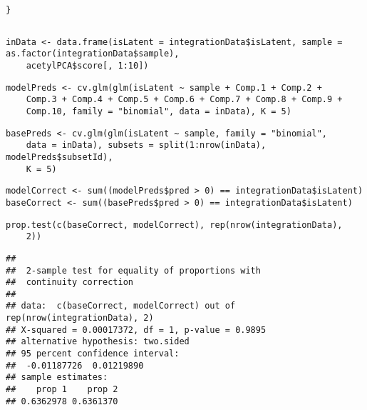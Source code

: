 \documentclass[../../sherrill-Mix_thesis.tex]{subfiles}
\makeatletter
\newenvironment{kframe}{%
 \def\at@end@of@kframe{}%
 \ifinner\ifhmode%
  \def\at@end@of@kframe{\end{minipage}}%
  \begin{minipage}{\columnwidth}%
 \fi\fi%
 \def\FrameCommand##1{\hskip\@totalleftmargin \hskip-\fboxsep
 \colorbox{shadecolor}{##1}\hskip-\fboxsep
     \hskip-\linewidth \hskip-\@totalleftmargin \hskip\columnwidth}%
 \MakeFramed {\advance\hsize-\width
   \@totalleftmargin\z@ \linewidth\hsize
   \@setminipage}}%
 {\par\unskip\endMakeFramed%
 \at@end@of@kframe}
\newenvironment{knitrout}{}{} %
\makeatother
\begin{document}
\begin{knitrout}
\begin{kframe}
\begin{lstlisting}[basicstyle=\ttfamily,breaklines=true]
}\end{lstlisting}
\begin{lstlisting}[basicstyle=\ttfamily,breaklines=true]
\end{lstlisting}
\begin{lstlisting}[basicstyle=\ttfamily,breaklines=true]
inData <- data.frame(isLatent = integrationData$isLatent, sample = as.factor(integrationData$sample), 
    acetylPCA$score[, 1:10])\end{lstlisting}
\begin{lstlisting}[basicstyle=\ttfamily,breaklines=true]
modelPreds <- cv.glm(glm(isLatent ~ sample + Comp.1 + Comp.2 + 
    Comp.3 + Comp.4 + Comp.5 + Comp.6 + Comp.7 + Comp.8 + Comp.9 + 
    Comp.10, family = "binomial", data = inData), K = 5)\end{lstlisting}
\begin{lstlisting}[basicstyle=\ttfamily,breaklines=true]
basePreds <- cv.glm(glm(isLatent ~ sample, family = "binomial", 
    data = inData), subsets = split(1:nrow(inData), modelPreds$subsetId), 
    K = 5)\end{lstlisting}
\begin{lstlisting}[basicstyle=\ttfamily,breaklines=true]
modelCorrect <- sum((modelPreds$pred > 0) == integrationData$isLatent)
baseCorrect <- sum((basePreds$pred > 0) == integrationData$isLatent)\end{lstlisting}
\begin{lstlisting}[basicstyle=\ttfamily,breaklines=true]
prop.test(c(baseCorrect, modelCorrect), rep(nrow(integrationData), 
    2))\end{lstlisting}
\begin{lstlisting}[basicstyle=\ttfamily,breaklines=true]
## 
## 	2-sample test for equality of proportions with
## 	continuity correction
## 
## data:  c(baseCorrect, modelCorrect) out of rep(nrow(integrationData), 2)
## X-squared = 0.00017372, df = 1, p-value = 0.9895
## alternative hypothesis: two.sided
## 95 percent confidence interval:
##  -0.01187726  0.01219890
## sample estimates:
##    prop 1    prop 2 
## 0.6362978 0.6361370
\end{lstlisting}
\end{kframe}
\end{knitrout}
\end{document}

